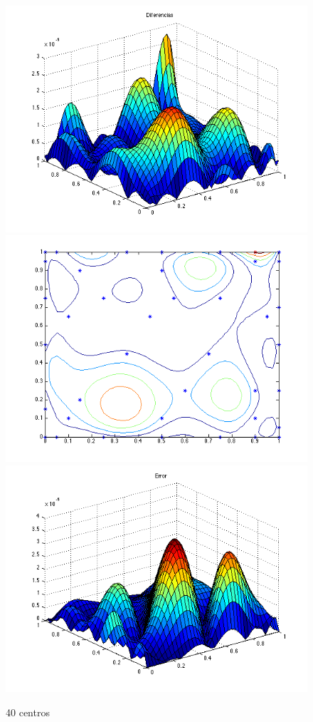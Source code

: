 \documentclass[11pt,a4paper]{article}
\begin{document}
\begin{figure}[H]
\centering

\includegraphics[scale=0.35]{diferencias40.png}
\includegraphics[scale=0.35]{centros40.png}
\includegraphics[scale=0.35]{error40.png}
\caption{40 centros}
\end{figure}
\end{document}
